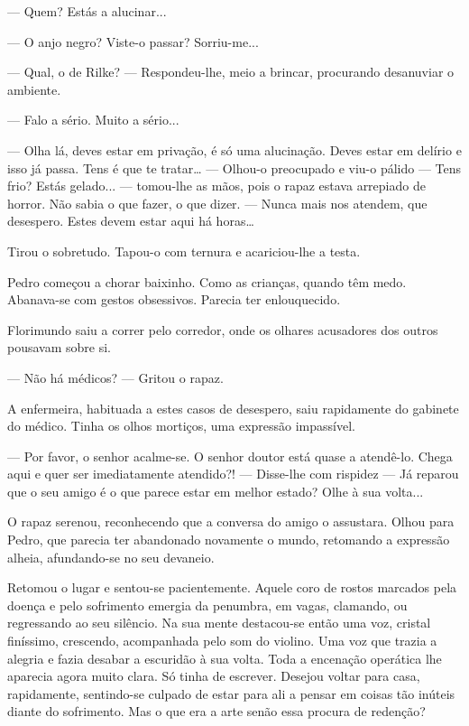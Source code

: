 --- Quem? Estás a alucinar...

--- O anjo negro? Viste-o passar? Sorriu-me...

--- Qual, o de Rilke? --- Respondeu-lhe, meio a brincar, procurando
desanuviar o ambiente.

--- Falo a sério. Muito a sério...

--- Olha lá, deves estar em privação, é só uma alucinação. Deves estar em
delírio e isso já passa. Tens é que te tratar\ldots{} --- Olhou-o
preocupado e viu-o pálido --- Tens frio? Estás gelado... --- tomou-lhe as
mãos, pois o rapaz estava arrepiado de horror. Não sabia o que fazer, o
que dizer. ---  Nunca mais nos atendem, que desespero. Estes devem estar
aqui há horas\ldots{}

Tirou o sobretudo. Tapou-o com ternura e acariciou-lhe a testa.

Pedro começou a chorar baixinho. Como as crianças, quando têm medo.
Abanava-se com gestos obsessivos. Parecia ter enlouquecido.

Florimundo saiu a correr pelo corredor, onde os olhares acusadores dos
outros pousavam sobre si.

--- Não há médicos? --- Gritou o rapaz.

A enfermeira, habituada a estes casos de desespero, saiu rapidamente do
gabinete do médico. Tinha os olhos mortiços, uma expressão impassível.

--- Por favor, o senhor acalme-se. O senhor doutor está quase a atendê-lo.
Chega aqui e quer ser imediatamente atendido?! ---  Disse-lhe com rispidez
--- Já reparou que o seu amigo é o que parece estar em melhor estado? Olhe
à sua volta...

O rapaz serenou, reconhecendo que a conversa do amigo o assustara. Olhou
para Pedro, que parecia ter abandonado novamente o mundo, retomando a
expressão alheia, afundando-se no seu devaneio.

Retomou o lugar e sentou-se pacientemente. Aquele coro de rostos
marcados pela doença e pelo sofrimento emergia da penumbra, em vagas,
clamando, ou regressando ao seu silêncio. Na sua mente destacou-se então
uma voz, cristal finíssimo, crescendo, acompanhada pelo som do violino.
Uma voz que trazia a alegria e fazia desabar a escuridão à sua volta.
Toda a encenação operática lhe aparecia agora muito clara. Só tinha de
escrever. Desejou voltar para casa, rapidamente, sentindo-se culpado de
estar para ali a pensar em coisas tão inúteis diante do sofrimento. Mas
o que era a arte senão essa procura de redenção?

